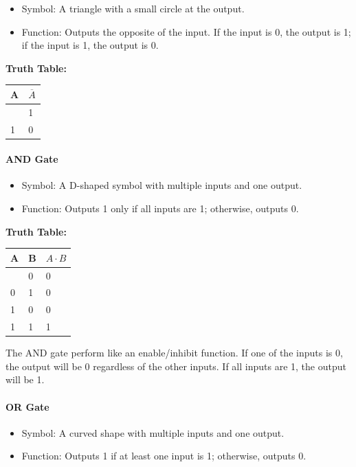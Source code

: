 \documentclass[
  a4paper,
]{article}
\providecommand{\tightlist}{%
  \setlength{\itemsep}{0pt}\setlength{\parskip}{0pt}}
\begin{document}
\begin{itemize}
\tightlist
\item
  Symbol: A triangle with a small circle at the output.
\item
  Function: Outputs the opposite of the input. If the input is 0, the
  output is 1; if the input is 1, the output is 0.
\end{itemize}

\textbf{Truth Table:}

\begin{longtable}[]{@{}ll@{}}
\toprule\noalign{}
A & \(\overline{A}\) \\
\midrule\noalign{}
\endhead
\bottomrule\noalign{}
\endlastfoot
0 & 1 \\
1 & 0 \\
\end{longtable}

\paragraph{AND Gate}\label{and-gate}

\begin{itemize}
\tightlist
\item
  Symbol: A D-shaped symbol with multiple inputs and one output.
\item
  Function: Outputs 1 only if all inputs are 1; otherwise, outputs 0.
\end{itemize}

\textbf{Truth Table:}

\begin{longtable}[]{@{}lll@{}}
\toprule\noalign{}
A & B & \(A \cdot B\) \\
\midrule\noalign{}
\endhead
\bottomrule\noalign{}
\endlastfoot
0 & 0 & 0 \\
0 & 1 & 0 \\
1 & 0 & 0 \\
1 & 1 & 1 \\
\end{longtable}

The AND gate perform like an enable/inhibit function. If one of the
inputs is 0, the output will be 0 regardless of the other inputs. If all
inputs are 1, the output will be 1.

\paragraph{OR Gate}\label{or-gate}

\begin{itemize}
\tightlist
\item
  Symbol: A curved shape with multiple inputs and one output.
\item
  Function: Outputs 1 if at least one input is 1; otherwise, outputs 0.
\end{itemize}
\end{document}

